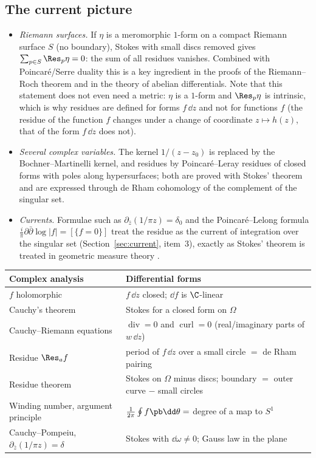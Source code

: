 \subsection{The current picture}\label{sec:rescurrent}

\begin{itemize}
\item \emph{Riemann surfaces.} If $\eta$ is a meromorphic $1$-form on a compact Riemann surface $S$ (no boundary), Stokes with small discs removed gives $\sum_{p\in S}\Res_p\eta=0$: the sum of all residues vanishes. Combined with Poincar\'e/Serre duality this is a key ingredient in the proofs of the Riemann--Roch theorem and in the theory of abelian differentials. Note that this statement does not even need a metric: $\eta$ is a $1$-form and $\Res_p\eta$ is intrinsic, which is why residues are defined for forms $f\,\dd z$ and not for functions $f$ (the residue of the function $f$ changes under a change of coordinate $z\mapsto h(z)$, that of the form $f\,\dd z$ does not).
\item \emph{Several complex variables.} The kernel $1/(z-z_0)$ is replaced by the Bochner--Martinelli kernel, and residues by Poincar\'e--Leray residues of closed forms with poles along hypersurfaces; both are proved with Stokes' theorem and are expressed through de Rham cohomology of the complement of the singular set.
\item \emph{Currents.} Formulae such as $\partial_{\bar z}(1/\pi z)=\delta_0$ and the Poincar\'e--Lelong formula $\frac i\pi\partial\bar\partial\log|f|=[\{f=0\}]$ treat the residue as the current of integration over the singular set (Section~\ref{sec:current}, item~3), exactly as Stokes' theorem is treated in geometric measure theory \cite{GriffithsHarris}.
\end{itemize}

\begin{center}
\small
\renewcommand{\arraystretch}{1.3}
\begin{tabular}{@{}p{4.6cm}p{9.6cm}@{}}
\toprule
\textbf{Complex analysis} & \textbf{Differential forms}\\
\midrule
$f$ holomorphic & $f\,\dd z$ closed; $\dd f$ is $\C$-linear\\
Cauchy's theorem & Stokes for a closed form on $\Omega$\\
Cauchy--Riemann equations & $\operatorname{div}=0$ and $\operatorname{curl}=0$ (real/imaginary parts of $w\,\dd z$)\\
Residue $\Res_af$ & period of $f\,\dd z$ over a small circle $=$ de Rham pairing\\
Residue theorem & Stokes on $\Omega$ minus discs; boundary $=$ outer curve $-$ small circles\\
Winding number, argument principle & $\frac1{2\pi}\oint f\pb\dd\theta=$ degree of a map to $S^1$\\
Cauchy--Pompeiu, $\partial_{\bar z}(1/\pi z)=\delta$ & Stokes with $\dd\omega\neq0$; Gauss law in the plane\\
\bottomrule
\end{tabular}
\end{center}
